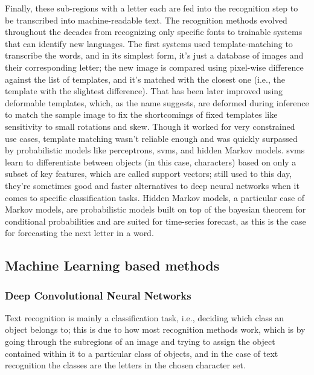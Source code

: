 Finally, these sub-regions with a letter each are fed into the recognition step to be transcribed into machine-readable text. The recognition methods evolved throughout the decades from recognizing only specific fonts to trainable systems that can identify new languages. The first systems used template-matching to transcribe the words, and in its simplest form, it's just a database of images and their corresponding letter; the new image is compared using pixel-wise difference against the list of templates, and it's matched with the closest one (i.e., the template with the slightest difference). That has been later improved using deformable templates, which, as the name suggests, are deformed during inference to match the sample image to fix the shortcomings of fixed templates like sensitivity to small rotations and skew. Though it worked for very constrained use cases, template matching wasn't reliable enough and was quickly surpassed by probabilistic models like perceptrons, \gls{svm}s, and hidden Markov models. \gls{svm}s learn to differentiate between objects (in this case, characters) based on only a subset of key features, which are called support vectors; still used to this day, they're sometimes good and faster alternatives to deep neural networks when it comes to specific classification tasks. Hidden Markov models, a particular case of Markov models, are probabilistic models built on top of the bayesian theorem for conditional probabilities and are suited for time-series forecast, as this is the case for forecasting the next letter in a word.

\subsection{Machine Learning based methods}

\subsubsection*{Deep Convolutional Neural Networks}

Text recognition is mainly a classification task, i.e., deciding which class an object belongs to; this is due to how most recognition methods work, which is by going through the subregions of an image and trying to assign the object contained within it to a particular class of objects, and in the case of text recognition the classes are the letters in the chosen character set.

